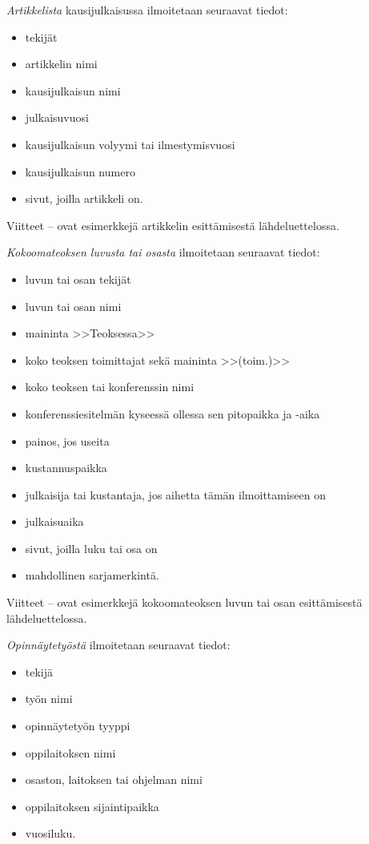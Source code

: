 \documentclass[english,12pt,a4paper,pdftex,elec,utf8]{aaltothesis}
\begin{document}
\textit{Artikkelista} kausijulkaisussa ilmoitetaan seuraavat tiedot:

\begin{itemize}

\item[--]tekij\"at
\item[--]artikkelin nimi
\item[--]kausijulkaisun nimi
\item[--]julkaisuvuosi
\item[--]kausijulkaisun volyymi tai ilmestymisvuosi
\item[--]kausijulkaisun numero
\item[--]sivut, joilla artikkeli on.
\end{itemize}

Viitteet \cite{bcs}--\cite{Deschamps} ovat esimerkkej\"a artikkelin
esitt\"amisest\"a l\"ahdeluettelossa.

\textit{Kokoomateoksen luvusta tai osasta} ilmoitetaan seuraavat tiedot:

\begin{itemize}
\item[--]luvun tai osan tekij\"at
\item[--]luvun tai osan nimi
\item[--]maininta >>Teoksessa>>
\item[--]koko teoksen toimittajat sek\"a maininta >>(toim.)>>
\item[--]koko teoksen tai konferenssin nimi
\item[--]konferenssiesitelm\"an kyseess\"a ollessa sen pitopaikka ja -aika
\item[--]painos, jos useita
\item[--]kustannuspaikka
\item[--]julkaisija tai kustantaja, jos aihetta t\"am\"an ilmoittamiseen on
\item[--]julkaisuaika
\item[--]sivut, joilla luku tai osa on 
\item[--]mahdollinen sarjamerkint\"a.
\end{itemize}

Viitteet \cite{Sihvola}--\cite{Lindblom} ovat esimerkkej\"a
kokoomateoksen luvun tai osan esitt\"amisest\"a l\"ahdeluettelossa. 

\textit{Opinn\"aytety\"ost\"a} ilmoitetaan seuraavat tiedot:

\begin{itemize}
\item[--]tekij\"a
\item[--]ty\"on nimi
\item[--]opinn\"aytety\"on tyyppi
\item[--]oppilaitoksen nimi
\item[--]osaston, laitoksen tai ohjelman nimi
\item[--]oppilaitoksen sijaintipaikka
\item[--]vuosiluku.
\end{itemize}
\end{document}
